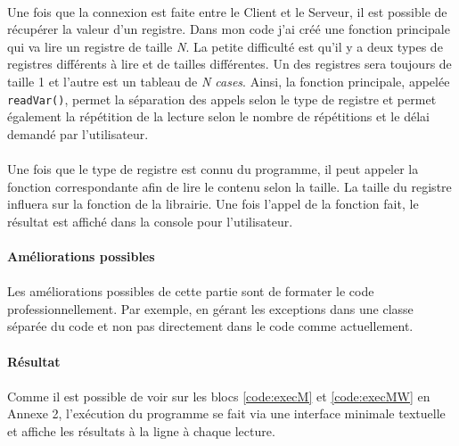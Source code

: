             \paragraph*{}
            Une fois que la connexion est faite entre le Client et le Serveur, il est possible de récupérer la valeur d'un registre. Dans mon code j'ai créé une fonction principale qui va lire un registre de taille \textit{N}. La petite difficulté est qu'il y a deux types de registres différents à lire et de tailles différentes. Un des registres sera toujours de taille 1 et l'autre est un tableau de \textit{N cases}. Ainsi, la fonction principale, appelée \verb|readVar()|, permet la séparation des appels selon le type de registre et permet également la répétition de la lecture selon le nombre de répétitions et le délai demandé par l'utilisateur.
            
            \paragraph*{}
            Une fois que le type de registre est connu du programme, il peut appeler la fonction correspondante afin de lire le contenu selon la taille. La taille du registre influera sur la fonction de la librairie. Une fois l'appel de la fonction fait, le résultat est affiché dans la console pour l'utilisateur.
            
        
        \paragraph{Améliorations possibles}    
            \paragraph*{}
            Les améliorations possibles de cette partie sont de formater le code professionnellement. Par exemple, en gérant les exceptions dans une classe séparée du code et non pas directement dans le code comme actuellement.
        
        \paragraph{Résultat}    
            \paragraph*{}
            Comme il est possible de voir sur les blocs \ref{code:execM} et \ref{code:execMW} en Annexe 2, l'exécution du programme se fait via une interface minimale textuelle et affiche les résultats à la ligne à chaque lecture.


